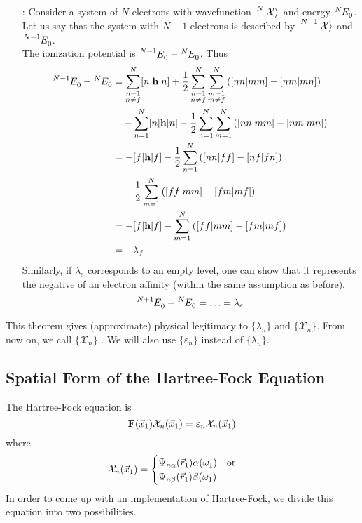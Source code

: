 \documentclass[12pt,a4paper,titlepage]{article}
\newcommand\hruleMod{%
	\vskip12pt
	\nointerlineskip
	{\color{lightgray}\leaders\vrule width \textwidth\vskip0.4pt}
	\nointerlineskip
	\vskip12pt
}
\newcommand{\aside}[3][]{ %
	\ifthenelse{\equal{#1}{}}{\hruleMod}{}
	\begin{itemize}[align=left,labelindent=0em,labelwidth=3em,labelsep*=0.5em,leftmargin=!]
		\item[\ul{#2}:]{#3}
	\end{itemize}
	\ifthenelse{\equal{#1}{}}{\hruleMod}{}
}
\newcommand{\ul}[1]{\underline{\smash{#1}}} %
\newcommand{\Chi}{\mathcal{X}} %
\begin{document}
\aside{Proof}{Consider a system of $N$ electrons with wavefunction $\tensor*[^{N}]{\ket{\Chi}}{}$ and energy $\tensor*[^{N}]{E}{_{0}}$. Let us say that the system with $N-1$ electrons is described by $\tensor*[^{N-1}]{\ket{\Chi}}{}$ and $\tensor*[^{N-1}]{E}{_{0}}$.\\

The ionization potential is $\tensor*[^{N-1}]{E}{_{0}}-\tensor*[^{N}]{E}{_{0}}$. Thus
\begin{equation}
\begin{aligned}
\tensor*[^{N-1}]{E}{_{0}}-\tensor*[^{N}]{E}{_{0}}&=\sum_{\substack{n=1\\n\neq f}}^{N}[n|\vb{h}|n]+\frac{1}{2}\sum_{\substack{n=1 \\ n\neq f}}^{N}\sum_{\substack{m=1 \\ m\neq f}}^{N}\qty([nn|mm]-[nm|mn])\\
&\quad-\sum_{n=1}^{N}[n|\vb{h}|n]-\frac{1}{2}\sum_{n=1}^{N}\sum_{m=1}^{N}\qty([nn|mm]-[nm|mn])\\
&=-[f|\vb{h}|f]-\frac{1}{2}\sum_{n=1}^{N}\qty([nn|ff]-[nf|fn])\\
&\quad-\frac{1}{2}\sum_{m=1}^{N}\qty([ff|mm]-[fm|mf])\\
&=-[f|\vb{h}|f]-\sum_{m=1}^{N}\qty([ff|mm]-[fm|mf])\\
&=-\lambda_{f}
\end{aligned}
\end{equation}
Similarly, if $\lambda_{e}$ corresponds to an empty level, one can show that it represents the negative of an electron affinity (within the same assumption as before).
\begin{equation}
\tensor*[^{N+1}]{E}{_{0}}-\tensor*[^{N}]{E}{_{0}}=\ldots=\lambda_{e}
\end{equation}
}
This theorem gives (approximate) physical legitimacy to $\{\lambda_{n}\}$ and $\{\Chi_{n}\}$. From now on, we call $\{\Chi_{n}\}$ \ul{spin orbitals}.  We will also use $\{\varepsilon_{n}\}$ instead of $\{\lambda_{n}\}$.

\subsection{Spatial Form of the Hartree-Fock Equation}
The Hartree-Fock equation is
\begin{equation}
\vb{F}(\vec{x}_{1})\Chi_{n}(\vec{x}_{1})=\varepsilon_{n}\Chi_{n}(\vec{x}_{1})
\end{equation}
where
\begin{equation}
\Chi_{n}(\vec{x}_{1})=\begin{cases}
\Psi_{n\alpha}(\vec{r}_{1})\alpha(\omega_{1}) \qq{or}\\
\Psi_{n\beta}(\vec{r}_{1})\beta(\omega_{1})
\end{cases}
\end{equation}
In order to come up with an implementation of Hartree-Fock, we divide this equation into two possibilities.\\
\end{document}
